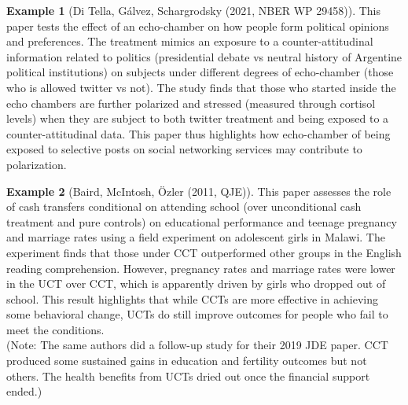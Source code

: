 \documentclass[12pt]{article}
\theoremstyle{definition}
\theoremstyle{property}
\theoremstyle{assumption}
\theoremstyle{example}
\newtheorem{example}{Example}[section]
\theoremstyle{comment}
\begin{document}
\begin{mdframed}[backgroundcolor=yellow!5] 
\begin{example}[Di Tella, Gálvez, Schargrodsky (2021, NBER WP 29458)]
This paper tests the effect of an echo-chamber on how people form political opinions and preferences. The treatment mimics an exposure to a counter-attitudinal information related to politics (presidential debate vs neutral history of Argentine political institutions) on subjects under different degrees of echo-chamber (those who is allowed twitter vs not). The study finds that those who started inside the echo chambers are further polarized and stressed (measured through cortisol levels) when they are subject to both twitter treatment and being exposed to a counter-attitudinal data. This paper thus highlights how echo-chamber of being exposed to selective posts on social networking services may contribute to polarization.  
\end{example}
\begin{example}[Baird, McIntosh, Özler (2011, QJE)] 
This paper assesses the role of cash transfers conditional on attending school (over unconditional cash treatment and pure controls) on educational performance and teenage pregnancy and marriage rates using a field experiment on adolescent girls in Malawi. The experiment finds that those under CCT outperformed other groups in the English reading comprehension. However, pregnancy rates and marriage rates were lower in the UCT over CCT, which is apparently driven by girls who dropped out of school. This result highlights that while CCTs are more effective in achieving some behavioral change, UCTs do still improve outcomes for people who fail to meet the conditions. \\
(Note: The same authors did a follow-up study for their 2019 JDE paper. CCT produced some sustained gains in education and fertility outcomes but not others. The health benefits from UCTs dried out once the financial support ended.)
\end{example}
\end{mdframed}

\end{document}
